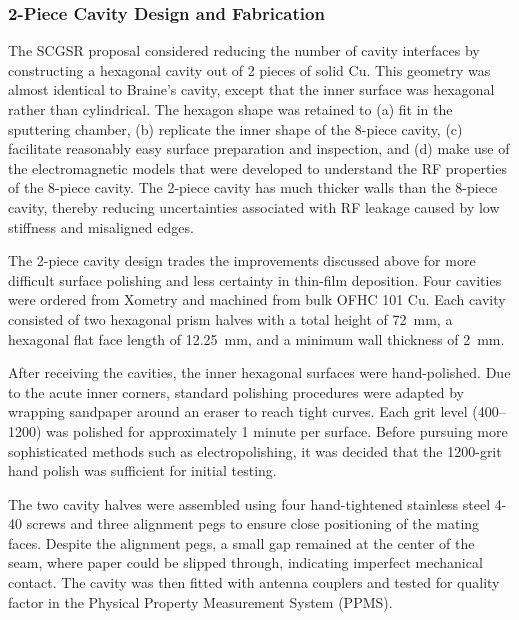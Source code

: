    \subsubsection{2-Piece Cavity Design and Fabrication}    
    
    The SCGSR proposal considered reducing the number of cavity interfaces by constructing a hexagonal cavity out of 2 pieces of solid Cu. This geometry was almost identical to Braine's cavity, except that the inner surface was hexagonal rather than cylindrical. The hexagon shape was retained to (a) fit in the sputtering chamber, (b) replicate the inner shape of the 8-piece cavity, (c) facilitate reasonably easy surface preparation and inspection, and (d) make use of the electromagnetic models that were developed to understand the RF properties of the 8-piece cavity. The 2-piece cavity has much thicker walls than the 8-piece cavity, thereby reducing uncertainties associated with RF leakage caused by low stiffness and misaligned edges.

    The 2-piece cavity design trades the improvements discussed above for more difficult surface polishing and less certainty in thin-film deposition. Four cavities were ordered from Xometry and machined from bulk OFHC 101 Cu. Each cavity consisted of two hexagonal prism halves with a total height of 72~mm, a hexagonal flat face length of 12.25~mm, and a minimum wall thickness of 2~mm. 
    
    After receiving the cavities, the inner hexagonal surfaces were hand-polished. Due to the acute inner corners, standard polishing procedures were adapted by wrapping sandpaper around an eraser to reach tight curves. Each grit level (400--1200) was polished for approximately 1 minute per surface. Before pursuing more sophisticated methods such as electropolishing, it was decided that the 1200-grit hand polish was sufficient for initial testing. 
    
    The two cavity halves were assembled using four hand-tightened stainless steel 4-40 screws and three alignment pegs to ensure close positioning of the mating faces. Despite the alignment pegs, a small gap remained at the center of the seam, where paper could be slipped through, indicating imperfect mechanical contact. The cavity was then fitted with antenna couplers and tested for quality factor in the Physical Property Measurement System (PPMS).

    

